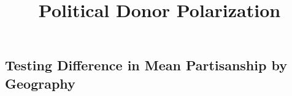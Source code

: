 \documentclass[10pt,]{article}
\title{Political Donor Polarization  }
\author{\Large \vspace{0.05in} \newline\normalsize\emph{}  }
\date{}
\newcommand*{\authorfont}{\fontfamily{phv}\selectfont}
\begin{document}
	
%

{%
\setlength{\parindent}{0pt}
\thispagestyle{plain}
{\fontsize{18}{20}\selectfont\raggedright 
\maketitle  %

}

{
   \vskip 13.5pt\relax \normalsize\fontsize{11}{12} 
\textbf{\authorfont } \hskip 15pt \emph{\small }   

}

}






\vskip -8.5pt



\noindent \doublespacing 

\newpage

\hypertarget{testing-difference-in-mean-partisanship-by-geography}{%
\subsection{Testing Difference in Mean Partisanship by
Geography}\label{testing-difference-in-mean-partisanship-by-geography}}
\end{document}
